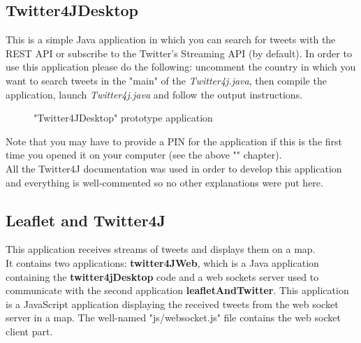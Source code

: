 \documentclass[a4paper,11pt]{report}
\begin{document}
\subsection{Twitter4JDesktop}
This is a simple Java application in which you can search for tweets with the REST API or subscribe to the Twitter's Streaming API (by default).
In order to use this application please do the following: uncomment the country in which you want to search tweets in the "main" of the \emph{Twitter4j.java}, then compile the application, launch \emph{Twitter4j.java} and follow the output instructions.
\begin{figure}[H]
\vspace{-5pt}
\begin{center}
\vspace{-20pt}
\caption{"Twitter4JDesktop" prototype application}
\end{center}
\end{figure}

Note that you may have to provide a PIN for the application if this is the first time you opened it on your computer (see the above "" chapter).\\

All the Twitter4J documentation was used in order to develop this application and everything is well-commented so no other explanations were put here.
\bigskip

\subsection{Leaflet and Twitter4J}
This application receives streams of tweets and displays them on a map.\\

It contains two applications: \textbf{twitter4JWeb}, which is a Java application containing the \textbf{twitter4jDesktop} code and a web sockets server used to communicate with the second application \textbf{leafletAndTwitter}. This application is a JavaScript application displaying the received tweets from the web socket server in a map. The well-named "js/websocket.js" file contains the web socket client part.\\
\end{document}

